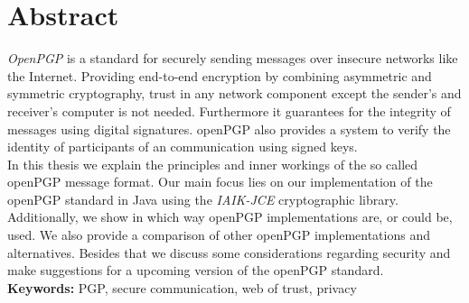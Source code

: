 

\chapter*{Abstract}
\label{cha:abstract}



\emph{OpenPGP} is a standard for securely sending messages over insecure networks like the Internet. Providing end-to-end encryption by combining asymmetric and symmetric cryptography, trust in any network component except the sender's and receiver's computer is not needed. Furthermore it guarantees for the integrity of messages using digital signatures. openPGP also provides a system to verify the identity of participants of an communication using signed keys. \\
 
 In this thesis we explain the principles and inner workings of the so called  openPGP message format. 
 Our main focus lies on our implementation of the openPGP standard in Java using the \emph{IAIK-JCE} cryptographic library. 
 Additionally, we show in which way openPGP implementations are, or could be, used.
 We also provide a comparison of other openPGP implementations and alternatives. 
 Besides that we discuss some considerations regarding security and make suggestions for a upcoming version of the openPGP standard. \\


\textbf{Keywords:} PGP, secure communication, web of trust, privacy


